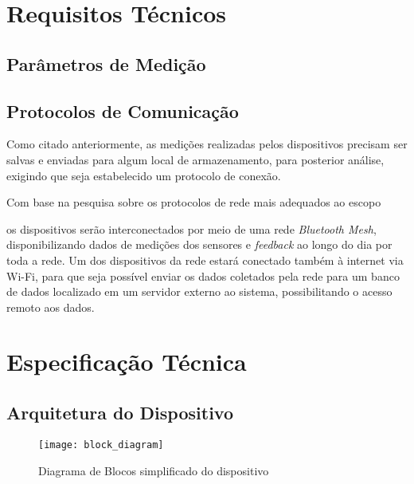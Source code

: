 \documentclass[../monografia.tex]{subfiles}
\begin{document}
\section{Requisitos Técnicos}

\subsection{Parâmetros de Medição}


\subsection{Protocolos de Comunicação}

Como citado anteriormente, as medições realizadas pelos dispositivos precisam ser salvas e enviadas para algum local de armazenamento, para posterior análise, exigindo que seja estabelecido um protocolo de conexão. 


Com base na pesquisa sobre os protocolos de rede mais adequados ao escopo

os dispositivos serão interconectados por meio de uma rede \textit{Bluetooth Mesh}, disponibilizando dados de medições dos sensores e \textit{feedback} ao longo do dia por toda a rede. Um dos dispositivos da rede estará conectado também à internet via Wi-Fi, para que seja possível enviar os dados coletados pela rede para um banco de dados localizado em um servidor externo ao sistema, possibilitando o acesso remoto aos dados.

\section{Especificação Técnica}

\subsection{Arquitetura do Dispositivo} %

\begin{figure}[h]
    \centering
    \texttt{[image: block\_diagram]}
    \caption{Diagrama de Blocos simplificado do dispositivo}
    \label{fig:Diagrama de Blocos}
\end{figure}
\end{document}
